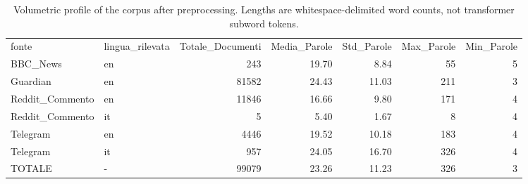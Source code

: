 \begin{table}
\caption{Volumetric profile of the corpus after preprocessing. Lengths are whitespace-delimited word counts, not transformer subword tokens.}
\label{tab:corpus_analysis}
\begin{tabular}{llrrrrr}
fonte & lingua_rilevata & Totale_Documenti & Media_Parole & Std_Parole & Max_Parole & Min_Parole \\
BBC_News & en & 243 & 19.70 & 8.84 & 55 & 5 \\
Guardian & en & 81582 & 24.43 & 11.03 & 211 & 3 \\
Reddit_Commento & en & 11846 & 16.66 & 9.80 & 171 & 4 \\
Reddit_Commento & it & 5 & 5.40 & 1.67 & 8 & 4 \\
Telegram & en & 4446 & 19.52 & 10.18 & 183 & 4 \\
Telegram & it & 957 & 24.05 & 16.70 & 326 & 4 \\
TOTALE & - & 99079 & 23.26 & 11.23 & 326 & 3 \\
\end{tabular}
\end{table}
